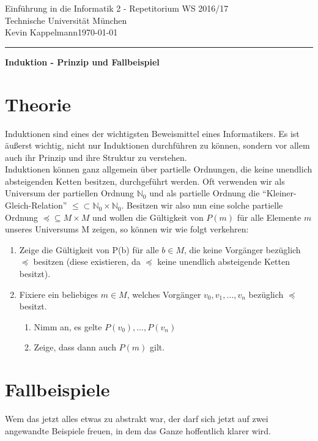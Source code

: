 \documentclass[hidelinks]{article}
\theoremstyle{plain}
\theoremstyle{definition}
\theoremstyle{rem}
\begin{document}

\begin{sloppypar}
\begingroup  
  \LARGE Einführung in die Informatik 2 - Repetitorium WS 2016/17\\Technische Universität München\\[0.5em]
  \large{Kevin Kappelmann\hfill \today}\\
\endgroup
\hrule height 1pt
{\LARGE{{\begin{center}\textbf{Induktion - Prinzip und Fallbeispiel}\end{center}}}}
\section{Theorie}
Induktionen sind eines der wichtigsten Beweismittel eines Informatikers. Es ist äußerst wichtig, nicht nur Induktionen durchführen zu können, sondern vor allem auch ihr Prinzip und ihre Struktur zu verstehen.\\
Induktionen können ganz allgemein über partielle Ordnungen, die keine unendlich absteigenden Ketten besitzen, durchgeführt werden. Oft verwenden wir als Universum der partiellen Ordnung $\mathbb{N}_0$ und als partielle Ordnung die ``Kleiner-Gleich-Relation'' $\le\subset\mathbb{N}_0\times\mathbb{N}_0$. Besitzen wir also nun eine solche partielle Ordnung $\preceq\subseteq M\times M$ und wollen die Gültigkeit von $P(m)$ für alle Elemente $m$ unseres Universums M zeigen, so können wir wie folgt verkehren:
\begin{enumerate}
\item Zeige die Gültigkeit von P(b) für alle $b\in M$, die keine Vorgänger bezüglich $\preceq$ besitzen (diese existieren, da $\preceq$ keine unendlich absteigende Ketten besitzt).
\item Fixiere ein beliebiges $m\in M$, welches Vorgänger $v_0,v_1,\ldots,v_n$ bezüglich $\preceq$ besitzt.
\begin{enumerate}
\item Nimm an, es gelte $P(v_0),\ldots,P(v_n)$
\item Zeige, dass dann auch $P(m)$ gilt.
\end{enumerate}
\end{enumerate}
\section{Fallbeispiele}
Wem das jetzt alles etwas zu abstrakt war, der darf sich jetzt auf zwei angewandte Beispiele freuen, in dem das Ganze hoffentlich klarer wird.

\end{sloppypar}
\end{document}
